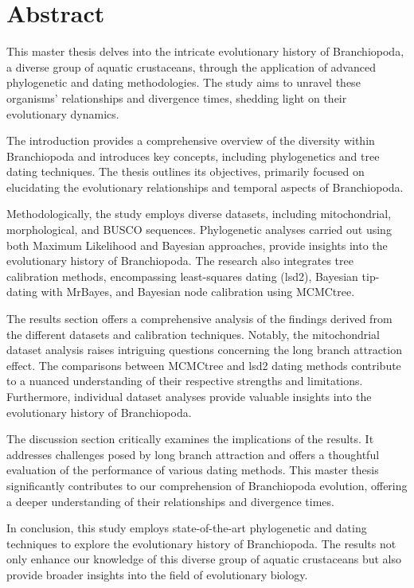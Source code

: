 

\chapter*{Abstract}
This master thesis delves into the intricate evolutionary history of Branchiopoda, a diverse group of aquatic crustaceans, through the application of advanced phylogenetic and dating methodologies. The study aims to unravel these organisms' relationships and divergence times, shedding light on their evolutionary dynamics.

The introduction provides a comprehensive overview of the diversity within Branchiopoda and introduces key concepts, including phylogenetics and tree dating techniques. The thesis outlines its objectives, primarily focused on elucidating the evolutionary relationships and temporal aspects of Branchiopoda.

Methodologically, the study employs diverse datasets, including mitochondrial, morphological, and BUSCO sequences. Phylogenetic analyses carried out using both Maximum Likelihood and Bayesian approaches, provide insights into the evolutionary history of Branchiopoda. The research also integrates tree calibration methods, encompassing least-squares dating (lsd2), Bayesian tip-dating with MrBayes, and Bayesian node calibration using MCMCtree.

The results section offers a comprehensive analysis of the findings derived from the different datasets and calibration techniques. Notably, the mitochondrial dataset analysis raises intriguing questions concerning the long branch attraction effect. The comparisons between MCMCtree and lsd2 dating methods contribute to a nuanced understanding of their respective strengths and limitations. Furthermore, individual dataset analyses provide valuable insights into the evolutionary history of Branchiopoda.

The discussion section critically examines the implications of the results. It addresses challenges posed by long branch attraction and offers a thoughtful evaluation of the performance of various dating methods. This master thesis significantly contributes to our comprehension of Branchiopoda evolution, offering a deeper understanding of their relationships and divergence times.

In conclusion, this study employs state-of-the-art phylogenetic and dating techniques to explore the evolutionary history of Branchiopoda. The results not only enhance our knowledge of this diverse group of aquatic crustaceans but also provide broader insights into the field of evolutionary biology.

